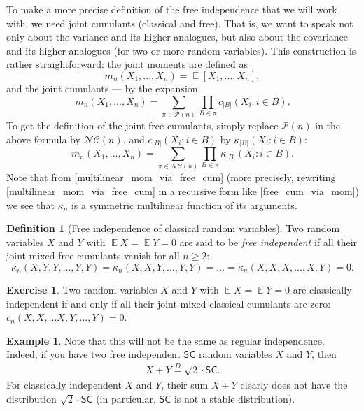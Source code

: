 \documentclass[letterpaper,11pt,oneside,reqno]{amsart}
\numberwithin{equation}{section}
\newcommand{\SC}{\mathsf{SC}}
\DeclareMathOperator{\EE}{\mathbb{E}}
\theoremstyle{definition}
\newtheorem{definition}[proposition]{Definition}
\newtheorem{example}[proposition]{Example}
\newtheorem{exercise}[proposition]{Exercise}
\begin{document}
To make a more precise definition of the free independence that we will work with, 
we need joint cumulants (classical and free).
That is, we want to speak not only about the variance and its higher analogues, 
but also about the covariance and its higher analogues (for two or more random variables).
This construction is rather straightforward: the joint moments are defined as
\begin{equation*}
	m_n(X_1,...,X_n)=\EE [X_1,...,X_n],
\end{equation*}
and the joint cumulants --- by the expansion
\begin{equation*}
	m_n(X_1,...,X_n)=\sum_{\pi\in\mathcal{P}(n)}\prod_{B\in\pi} c_{|B|}(X_i\colon i\in B).
\end{equation*}
To get the definition of the joint free cumulants, simply replace 
$\mathcal{P}(n)$ in the above formula by $\mathcal{NC}(n)$, and 
$c_{|B|}(X_i\colon i\in B)$
by
$\kappa_{|B|}(X_i\colon i\in B)$:
\begin{equation}\label{multilinear_mom_via_free_cum}
	m_n(X_1,...,X_n)=\sum_{\pi\in\mathcal{NC}(n)}\prod_{B\in\pi} \kappa_{|B|}(X_i\colon i\in B).
\end{equation}
Note that from \eqref{multilinear_mom_via_free_cum}
(more precisely, rewriting \eqref{multilinear_mom_via_free_cum}
in a recursive form like \eqref{free_cum_via_mom})
we see that $\kappa_n$ is a symmetric multilinear function of its arguments.

\begin{definition}[Free independence of classical random variables]\label{def:free_indep_classical}
	Two random variables $X$ and $Y$ 
	with $\EE X=\EE Y=0$
	are said to be 
	\emph{free independent} if all their joint mixed free cumulants vanish for all $n\ge2$:
	\begin{equation*}
		\kappa_n(X,Y,Y,\ldots,Y,Y)=
		\kappa_n(X,X,Y,\ldots,Y,Y)=\ldots=
		\kappa_n(X,X,X,\ldots,X,Y)=0.
	\end{equation*}
\end{definition}
    
\begin{exercise}
	Two random variables $X$ and $Y$ 
	with $\EE X=\EE Y=0$
	are classically independent
	if and only if all their joint mixed classical cumulants are zero:
	$c_n(X,X,...X,Y,...,Y)=0$.
\end{exercise}

\begin{example}
	Note that this will not be the same as regular independence. Indeed, 
	if you have two free independent $\SC$ random variables $X$ and $Y$, then
	\begin{align*}
	    X+Y\stackrel{D}{=} \sqrt 2\cdot \SC.
	\end{align*}
	For classically independent 
	$X$ and $Y$, their sum $X+Y$ clearly
	does not have the distribution $\sqrt 2\cdot \SC$
	(in particular,
	$\SC$ is not a stable distribution).
\end{example}
\end{document}
